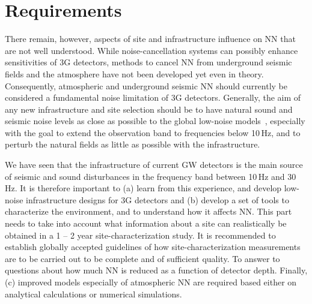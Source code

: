\section{Requirements}
There remain, however, aspects of site and infrastructure influence on NN that are not well understood. 
While noise-cancellation systems can possibly enhance sensitivities of 3G detectors, methods to cancel NN from underground seismic fields and the atmosphere have not been developed yet even in theory. Consequently, atmospheric and underground seismic NN should currently be considered a fundamental noise limitation of 3G detectors. Generally, the aim of any new infrastructure and site selection should be to have natural sound and seismic noise levels as close as possible to the global low-noise models~\cite{Pet1993}, especially with the goal to extend the observation band to frequencies below 10\,Hz, and to perturb the natural fields as little as possible with the infrastructure. 

We have seen that the infrastructure of current GW detectors is the main source of seismic and sound disturbances in the frequency band between 10\,Hz and 30\,Hz. It is therefore important to (a) learn from this experience, and develop low-noise infrastructure designs for 3G detectors %
and (b) 
develop a set of tools to characterize the environment, and to understand how it affects NN. This part needs to take into account what information about a site can realistically be obtained in a 1 -- 2 year site-characterization study. It is recommended to establish globally accepted guidelines of how site-characterization measurements are to be carried out to be complete and of sufficient quality. To answer to questions about how much NN is reduced as a function of detector depth. Finally, (c) improved models especially of atmospheric NN are required based either on analytical calculations or numerical simulations.

